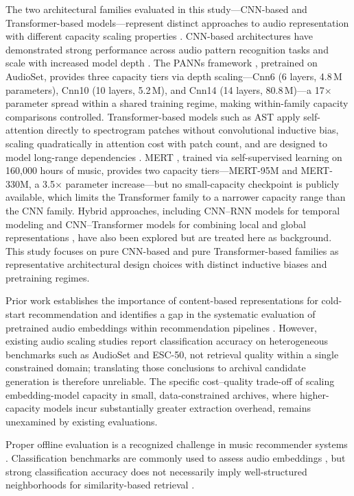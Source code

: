 \documentclass{CPP}
\begin{document}
The two architectural families evaluated in this study---CNN-based and Transformer-based models---represent distinct approaches to audio representation with different capacity scaling properties \cite{zaman2023}. CNN-based architectures have demonstrated strong performance across audio pattern recognition tasks and scale with increased model depth \cite{kong2020panns}. The PANNs framework \cite{kong2020panns}, pretrained on AudioSet, provides three capacity tiers via depth scaling---Cnn6 (6 layers, 4.8\,M parameters), Cnn10 (10 layers, 5.2\,M), and Cnn14 (14 layers, 80.8\,M)---a 17$\times$ parameter spread within a shared training regime, making within-family capacity comparisons controlled. Transformer-based models such as AST \cite{gong2021ast} apply self-attention directly to spectrogram patches without convolutional inductive bias, scaling quadratically in attention cost with patch count, and are designed to model long-range dependencies \cite{zaman2023}. MERT \cite{li2023mert}, trained via self-supervised learning on 160,000 hours of music, provides two capacity tiers---MERT-95M and MERT-330M, a 3.5$\times$ parameter increase---but no small-capacity checkpoint is publicly available, which limits the Transformer family to a narrower capacity range than the CNN family. Hybrid approaches, including CNN--RNN models for temporal modeling \cite{lin2024} and CNN--Transformer models for combining local and global representations \cite{pourmoazemi2024}, have also been explored but are treated here as background. This study focuses on pure CNN-based and pure Transformer-based families as representative architectural design choices with distinct inductive biases and pretraining regimes.

Prior work establishes the importance of content-based representations for cold-start recommendation \cite{schedl2018, deldjoo2024} and identifies a gap in the systematic evaluation of pretrained audio embeddings within recommendation pipelines \cite{tamm2024}. However, existing audio scaling studies \cite{zaman2023} report classification accuracy on heterogeneous benchmarks such as AudioSet and ESC-50, not retrieval quality within a single constrained domain; translating those conclusions to archival candidate generation is therefore unreliable. The specific cost--quality trade-off of scaling embedding-model capacity in small, data-constrained archives, where higher-capacity models incur substantially greater extraction overhead, remains unexamined by existing evaluations.

Proper offline evaluation is a recognized challenge in music recommender systems \cite{schedl2018}. Classification benchmarks are commonly used to assess audio embeddings \cite{gong2021ast, zaman2023}, but strong classification accuracy does not necessarily imply well-structured neighborhoods for similarity-based retrieval \cite{tamm2024}.
\end{document}
